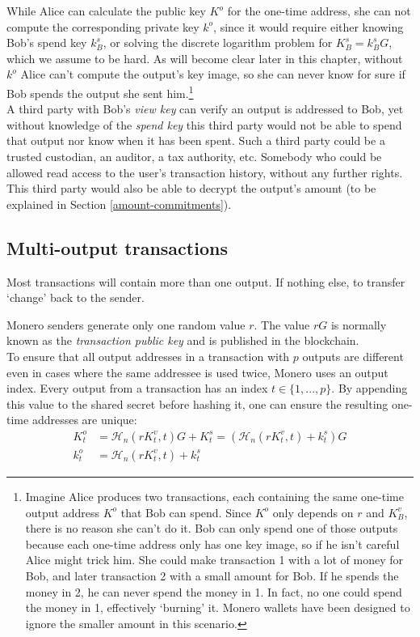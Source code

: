 While Alice can calculate the public key $K^o$ for the one-time address, she can not compute the corresponding private key $k^o$, since it would require either knowing Bob’s spend key $k_B^s$, or solving the discrete logarithm problem for $K_B^s = k_B^s G$, which we assume to be hard. As will become clear later in this chapter, without $k^o$ Alice can't compute the output's key image, so she can never know for sure if Bob spends the output she sent him.\footnote{Imagine Alice produces two transactions, each containing the same one-time output address $K^o$ that Bob can spend. Since $K^o$ only depends on $r$ and $K_B^v$, there is no reason she can't do it. Bob can only spend one of those outputs because each one-time address only has one key image, so if he isn't careful Alice might trick him. She could make transaction 1 with a lot of money for Bob, and later transaction 2 with a small amount for Bob. If he spends the money in 2, he can never spend the money in 1. In fact, no one could spend the money in 1, effectively `burning' it. Monero wallets have been designed to ignore the smaller amount in this scenario.}
\\

A third party with Bob’s {\em view key} can verify an output is addressed to Bob, yet without knowledge of the {\em spend key} this third party would not be able to spend that output nor know when it has been spent. Such a third party could be a trusted custodian, an auditor, a tax authority, etc. Somebody who could be allowed read access to the user’s transaction history, without any further rights. This third party would also be able to decrypt the output's amount (to be explained in Section \ref{amount-commitments}).


\subsection{Multi-output transactions}
\label{sec:multi_out_transactions}

Most transactions will contain more than one output. If nothing else, to transfer `change’ back to the sender.

Monero senders generate only one random value $r$. The value $r G$ is normally known as the {\em transaction public key} and is published in the blockchain.\\

To ensure that all output addresses in a transaction with $p$ outputs are different even in cases where the same addressee is used twice, Monero uses an output index. Every output from a transaction has an index $t \in \{1, ..., p\}$. By appending this value to the shared secret before hashing it, one can ensure the resulting one-time addresses are unique:\\
\begin{align*}
  K_t^o &= \mathcal{H}_n(r K_t^v, t)G + K_t^s = (\mathcal{H}_n(r K_t^v, t) + k_t^s)G  \\
  k_t^o &= \mathcal{H}_n(r K_t^v, t) + k_t^s
\end{align*}

